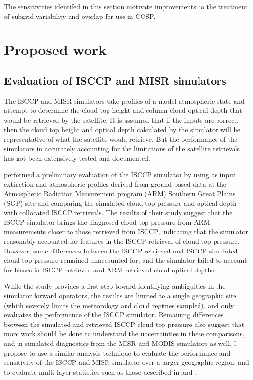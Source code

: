 \documentclass[letter]{article}
\begin{document}
The sensitivities identifed in this section motivate improvements to the treatment of subgrid variability and overlap for use in COSP.

\section{Proposed work}

\subsection{Evaluation of ISCCP and MISR simulators}
The ISCCP and MISR simulators take profiles of a model atmospheric state and attempt to determine the cloud top height and column cloud optical depth that would be retrieved by the satellite. It is assumed that if the inputs are correct, then the cloud top height and optical depth calculated by the simulator will be representative of what the satellite would retrieve. But the performance of the simulators in accurately accounting for the limitations of the satellite retrievals has not been extensively tested and documented.

\cite{mace_et_al_2010} performed a preliminary evaluation of the ISCCP simulator by using as input extinction and atmospheric profiles derived from ground-based data at the Atmospheric Radiation Measurement program (ARM) Southern Great Plains (SGP) site and comparing the simulated cloud top pressure and optical depth with collocated ISCCP retrievals. The results of their study suggest that the ISCCP simulator brings the diagnosed cloud top pressure from ARM measurements closer to those retrieved from ISCCP, indicating that the simulator reasonably accounted for features in the ISCCP retrieval of cloud top pressure. However, some differences between the ISCCP-retrieved and ISCCP-simulated cloud top pressure remained unaccounted for, and the simulator failed to account for biases in ISCCP-retrieved and ARM-retrieved cloud optical depths. 

While the \cite{mace_et_al_2010} study provides a first-step toward identifying ambiguities in the simulator forward operators, the results are limited to a single geographic site (which severely limits the meteorology and cloud regimes sampled), and only evaluates the performance of the ISCCP simulator. Remaining differences between the simulated and retrieved ISCCP cloud top pressure also suggest that more work should be done to understand the uncertainties in these comparisons, and in simulated diagnostics from the MISR and MODIS simulators as well. I propose to use a similar analysis technique to evaluate the performance and sensitivity of the ISCCP and MISR simulator over a larger geographic region, and to evaluate multi-layer statistics such as those described in \cite{marchand_et_al_2010} and \cite{marchand_and_ackerman_2010}.
\end{document}
